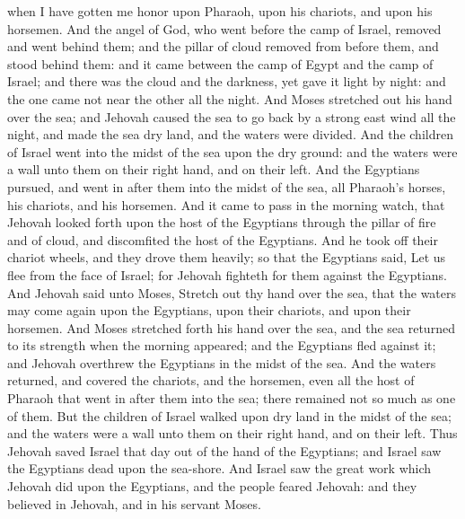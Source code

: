 when I have gotten me honor upon Pharaoh, upon his chariots, and upon his horsemen. And the angel of God, who went before the camp of Israel, removed and went behind them; and the pillar of cloud removed from before them, and stood behind them: and it came between the camp of Egypt and the camp of Israel; and there was the cloud and the darkness, yet gave it light by night: and the one came not near the other all the night.  And Moses stretched out his hand over the sea; and Jehovah caused the sea to go back by a strong east wind all the night, and made the sea dry land, and the waters were divided. And the children of Israel went into the midst of the sea upon the dry ground: and the waters were a wall unto them on their right hand, and on their left. And the Egyptians pursued, and went in after them into the midst of the sea, all Pharaoh’s horses, his chariots, and his horsemen. And it came to pass in the morning watch, that Jehovah looked forth upon the host of the Egyptians through the pillar of fire and of cloud, and discomfited the host of the Egyptians. And he took off their chariot wheels, and they drove them heavily; so that the Egyptians said, Let us flee from the face of Israel; for Jehovah fighteth for them against the Egyptians.  And Jehovah said unto Moses, Stretch out thy hand over the sea, that the waters may come again upon the Egyptians, upon their chariots, and upon their horsemen. And Moses stretched forth his hand over the sea, and the sea returned to its strength when the morning appeared; and the Egyptians fled against it; and Jehovah overthrew the Egyptians in the midst of the sea. And the waters returned, and covered the chariots, and the horsemen, even all the host of Pharaoh that went in after them into the sea; there remained not so much as one of them. But the children of Israel walked upon dry land in the midst of the sea; and the waters were a wall unto them on their right hand, and on their left. Thus Jehovah saved Israel that day out of the hand of the Egyptians; and Israel saw the Egyptians dead upon the sea-shore. And Israel saw the great work which Jehovah did upon the Egyptians, and the people feared Jehovah: and they believed in Jehovah, and in his servant Moses. 

